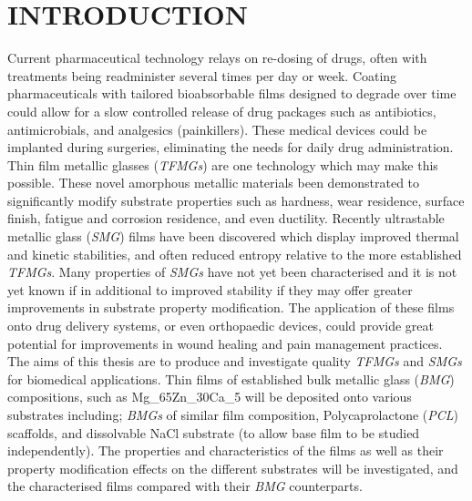 \section{INTRODUCTION }

Current pharmaceutical technology relays on re-dosing of drugs, often with treatments being readminister several times per day or week. Coating pharmaceuticals with tailored bioabsorbable films designed to degrade over time could allow for a slow controlled release of drug packages such as antibiotics, antimicrobials, and analgesics (painkillers). These medical devices could be implanted during surgeries, eliminating the needs for daily drug administration.  
Thin film metallic glasses (\textit{TFMGs}) are one technology which may make this possible. These novel amorphous metallic materials been demonstrated to significantly modify substrate properties such as hardness, wear residence, surface finish, fatigue and corrosion residence, and even ductility. Recently ultrastable metallic glass (\textit{SMG}) films have been discovered which display improved thermal and kinetic stabilities, and often reduced entropy relative to the more established \textit{TFMGs}. Many properties of \textit{SMGs} have not yet been characterised and it is not yet known if in additional to improved stability if they may offer greater improvements in substrate property modification. The application of these films onto drug delivery systems, or even orthopaedic devices, could provide great potential for improvements in wound healing and pain management practices.
The aims of this thesis are to produce and investigate quality \textit{TFMGs} and \textit{SMGs} for biomedical applications. Thin films of established bulk metallic glass (\textit{BMG}) compositions, such as Mg_{65}Zn_{30}Ca_{5} will be deposited onto various substrates including; \textit{BMGs} of similar film composition, Polycaprolactone (\textit{PCL}) scaffolds, and dissolvable NaCl substrate (to allow base film to be studied independently). The properties and characteristics of the films as well as their property modification effects on the different substrates will be investigated, and the characterised films compared with their \textit{BMG} counterparts. 
